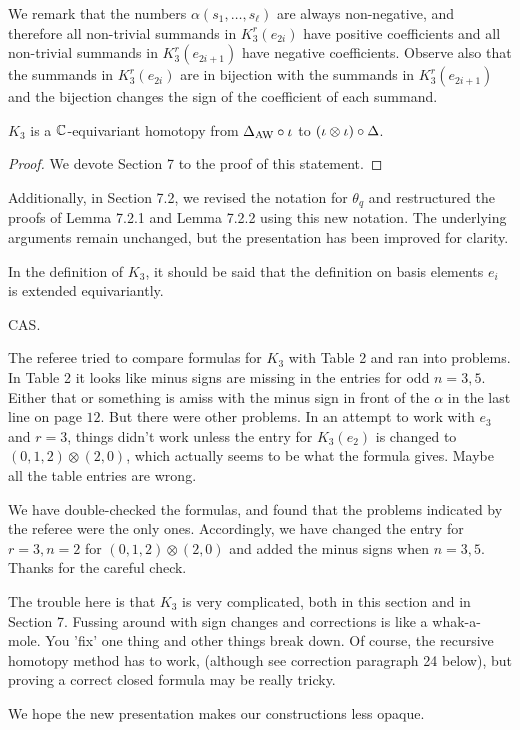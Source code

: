 	We remark that the numbers $\alpha(s_1,\ldots,s_\ell)$ are always non-negative, and therefore all non-trivial summands in $K_3^r(e_{2i})$ have positive coefficients and all non-trivial summands in $K_3^r(e_{2i+1})$ have negative coefficients.
	Observe also that the summands in $K_3^r(e_{2i})$ are in bijection with the summands in $K_3^r(e_{2i+1})$ and the bijection changes the sign of the coefficient of each summand.

	\begin{lemma}\label{l:K3}
		$K_3$ is a $\mathbb{C}$-equivariant homotopy from $\Delta_{\operatorname{AW}} \mathbin{\circ} \iota$ to $(\iota \otimes \iota) \mathbin{\circ} \Delta$.
	\end{lemma}

	\begin{proof}
		We devote Section 7 to the proof of this statement.
	\end{proof}

	\ar Additionally, in Section 7.2, we revised the notation for $\theta_q$ and restructured the proofs of Lemma 7.2.1 and Lemma 7.2.2 using this new notation.
	The underlying arguments remain unchanged, but the presentation has been improved for clarity.

    \subitem In the definition of $K_3$, it should be said that the definition on basis elements $e_i$ is extended equivariantly.

    \ar CAS.

    \subitem The referee tried to compare formulas for $K_3$ with Table 2 and ran into problems. In Table 2 it looks like minus signs are missing in the entries for odd $n=3,5$. Either that or something is amiss with the minus sign in front of the $\alpha$ in the last line on page $12$. But there were other problems. In an attempt to work with $e_3$ and $r=3$, things didn't work unless the entry for $K_3(e_2)$ is changed to $(0,1,2)\otimes (2,0)$, which actually seems to be what the formula gives.
    Maybe all the table entries are wrong.

    \ar We have double-checked the formulas, and found that the problems indicated by the referee were the only ones. Accordingly, we have changed the entry for $r=3,n=2$ for $(0,1,2) \otimes (2,0)$ and added the minus signs when $n=3,5$.
    Thanks for the careful check.

    \subitem The trouble here is that $K_3$ is very complicated, both in this section and in Section 7. Fussing around with sign changes and corrections is like a whak-a-mole. You 'fix' one thing and other things break down. Of course, the recursive homotopy method has to work, (although see correction paragraph 24 below), but proving a correct closed formula may be really tricky.

    \ar We hope the new presentation makes our constructions less opaque.